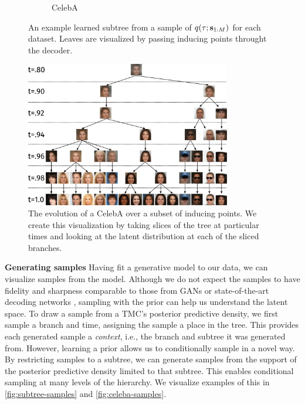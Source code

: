 \begin{figure}[t]
\begin{subfigure}[t]{0.3\textwidth}
\caption{CelebA}
\end{subfigure}
\caption{An example learned subtree from a sample of $q(\tau; \mathbf{s}_{1:M})$ for each dataset. 
Leaves are visualized by passing inducing points throught the decoder.}
\label{fig:subtrees}
\end{figure}
\begin{figure}[t]
\centering
\includegraphics[width=0.8\textwidth]{img/loracs/celeba/celeba-evolution.png}
\caption{The evolution of a CelebA over a subset of inducing points. We create
this visualization by taking slices of the tree at particular times
and looking at the latent distribution 
at each of the sliced branches.}
\label{fig:celeba-evolution}
\end{figure}

\textbf{Generating samples} 
Having fit a generative model to our data,
we can visualize samples from the model.
Although we do not expect the samples
to have fidelity and sharpness comparable
to those from GANs or state-of-the-art
decoding networks \citep{Radford2015, Salimans2017},
sampling with the
\acronym\;prior can help us understand the latent space.
To draw a sample from a TMC's posterior predictive density,
we first sample a branch and time, assigning
the sample a place in the tree.
This provides each generated sample a \emph{context},
i.e., the branch and subtree it was generated from.
However, learning a \acronym\;prior allows us to
conditionally sample in a novel way. By restricting
samples to a subtree, we can generate samples
from the support of the posterior predictive density
limited to that subtree. This enables
conditional sampling at many levels of
the hierarchy. We visualize examples
of this in \autoref{fig:subtree-samples}
and \autoref{fig:celeba-samples}.

